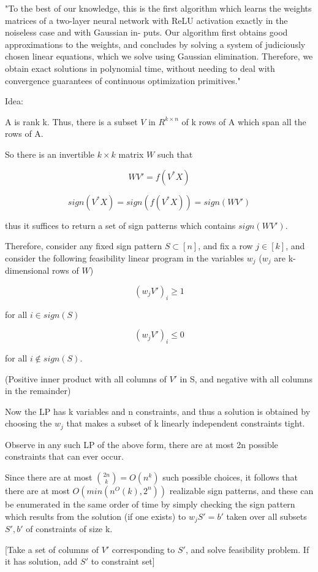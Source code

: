 \documentclass[english]{article}
\begin{document}
"To the best of our knowledge, this is the first algorithm which learns the weights matrices of a
two-layer neural network with ReLU activation exactly in the noiseless case and with Gaussian in-
puts. Our algorithm first obtains good approximations to the weights, and concludes by
solving a system of judiciously chosen linear equations, which we solve using Gaussian elimination.
Therefore, we obtain exact solutions in polynomial time, without needing to deal with convergence
guarantees of continuous optimization primitives."


Idea:


A is rank k. Thus, there is a subset $V$ in $R^{k\times n}$ of k rows of A which span all the rows of A.

So there is an invertible $k\times k$ matrix $W$ such that 

$$WV' = f(V^*X)$$

$$ sign(V^*X) = sign(f(V^*X)) = sign(WV')$$

thus it suffices to return a set of sign patterns which contains $sign(WV')$.

Therefore, consider any fixed sign pattern $S \subset [n]$, and fix a row $j \in [k]$, and consider the following
feasibility linear program in the variables $w_j$ ($w_j$ are k-dimensional rows of $W$)

$$(w_j V')_i \ge 1$$ 

for all $i \in sign(S)$

$$(w_j V')_i \le 0$$ 

for all $i \notin sign(S)$.


(Positive inner product with all columns of $V'$ in S, and negative with all columns in the remainder)


Now the LP has k variables and n constraints, and thus a
solution is obtained by choosing the $w_j$ that makes a subset of k linearly independent constraints
tight.  

Observe in any such LP of the above form, there are at most 2n possible constraints that
can ever occur. 

Since there are at most $\binom{2n}{k}= O(n^k)$ such possible choices, it follows that there are at most $O(min(n^O(k),2^n))$ realizable sign patterns, and these can be enumerated in the same order of time by simply checking the sign pattern which results from the solution (if one
exists) to $w_j S' =b'$ taken over all subsets $S',b'$ of constraints of size k.

[Take a set of columns of $V'$ corresponding to $S'$, and solve feasibility problem. If it has solution, add $S'$ to constraint set]
\end{document}
